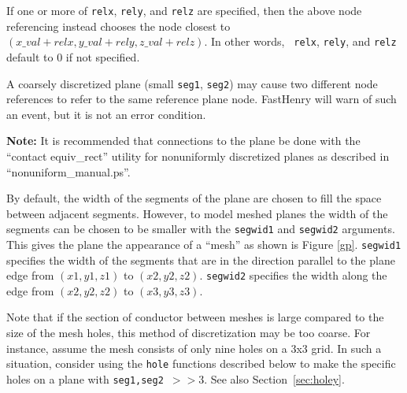 If one or more of {\tt relx}, {\tt rely}, and {\tt relz} are
specified, then the above node referencing instead chooses the node closest to
$(x\_val + relx, y\_val + rely, z\_val + relz)$.  In other words, {\tt
relx}, {\tt rely}, and {\tt relz} default to $0$ if not specified.

A coarsely discretized plane (small {\tt seg1}, {\tt seg2}) may cause
two different node references to refer to 
the same reference plane node.  FastHenry will warn of such an event, but
it is not an error condition.

{\bf Note:} It is recommended that connections to the plane be done
with the ``contact equiv\_rect'' utility for nonuniformly discretized
planes as described in ``nonuniform\_manual.ps''.

\vspace{0.3in}

By default, the width of the segments of the plane are chosen to fill
the space between adjacent segments.  However, to model meshed planes
the width of the segments can be chosen to be smaller
with the {\tt segwid1} and {\tt segwid2} arguments.  This
gives the plane the appearance of a ``mesh'' as shown is Figure
\ref{gp}.  {\tt segwid1} specifies the width of the segments that are in the
direction parallel to the plane edge from $(x1,y1,z1)$ to
$(x2,y2,z2)$.  {\tt segwid2} specifies the width along the edge from
$(x2,y2,z2)$ to $(x3,y3,z3)$.  

Note that if the section of conductor between meshes is large compared
to the size of the mesh holes, this method of discretization may be
too coarse.  
For instance, assume the mesh consists of only nine holes on a 3x3
grid.  In such a situation, consider using the {\tt hole} functions
described below to make the specific holes on a plane
with {\tt seg1,seg2}~$>> 3$.  See also Section~\ref{sec:holey}.

\vspace{0.3in}

